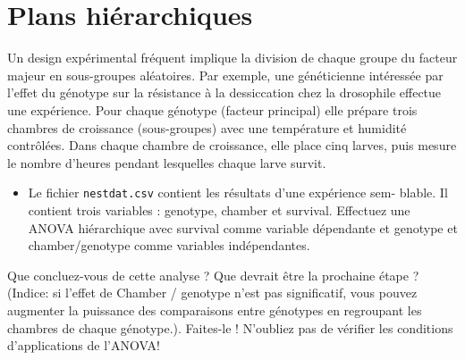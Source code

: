 \documentclass[12pt,]{book}
\newenvironment{Shaded}{\begin{snugshade}}{\end{snugshade}}
\newcommand{\DataTypeTok}[1]{\textcolor[rgb]{0.27,0.27,0.27}{#1}}
\newcommand{\KeywordTok}[1]{\textcolor[rgb]{0.27,0.27,0.27}{\textbf{#1}}}
\newcommand{\NormalTok}[1]{#1}
\newcommand{\OperatorTok}[1]{\textcolor[rgb]{0.43,0.43,0.43}{\textbf{#1}}}
\newcommand{\StringTok}[1]{\textcolor[rgb]{0.5,0.5,0.5}{#1}}
\providecommand{\tightlist}{%
  \setlength{\itemsep}{0pt}\setlength{\parskip}{0pt}}
\begin{document}
\hypertarget{plans-hiuxe9rarchiques}{%
\section{Plans hiérarchiques}\label{plans-hiuxe9rarchiques}}

Un design expérimental fréquent implique la division de chaque groupe du facteur majeur en sous-groupes aléatoires. Par exemple, une généticienne intéressée par l'effet du génotype sur la résistance à la dessiccation chez la drosophile effectue une expérience. Pour chaque génotype (facteur principal) elle prépare trois chambres de croissance (sous-groupes) avec une température et humidité contrôlées. Dans chaque chambre de croissance, elle place cinq larves, puis mesure le nombre d'heures pendant lesquelles chaque larve survit.

\begin{itemize}
\tightlist
\item
  Le fichier \texttt{nestdat.csv} contient les résultats d'une expérience sem- blable. Il contient trois variables : genotype, chamber et survival. Effectuez une ANOVA hiérarchique avec survival comme variable dépendante et genotype et chamber/genotype comme variables indépendantes.
\end{itemize}

\begin{Shaded}
\end{Shaded}

Que concluez-vous de cette analyse ? Que devrait être la prochaine étape ? (Indice: si l'effet de Chamber / genotype n'est pas significatif, vous pouvez augmenter la puissance des comparaisons entre génotypes en regroupant les chambres de chaque génotype.). Faites-le ! N'oubliez pas de vérifier les conditions d'applications de l'ANOVA!
\end{document}

